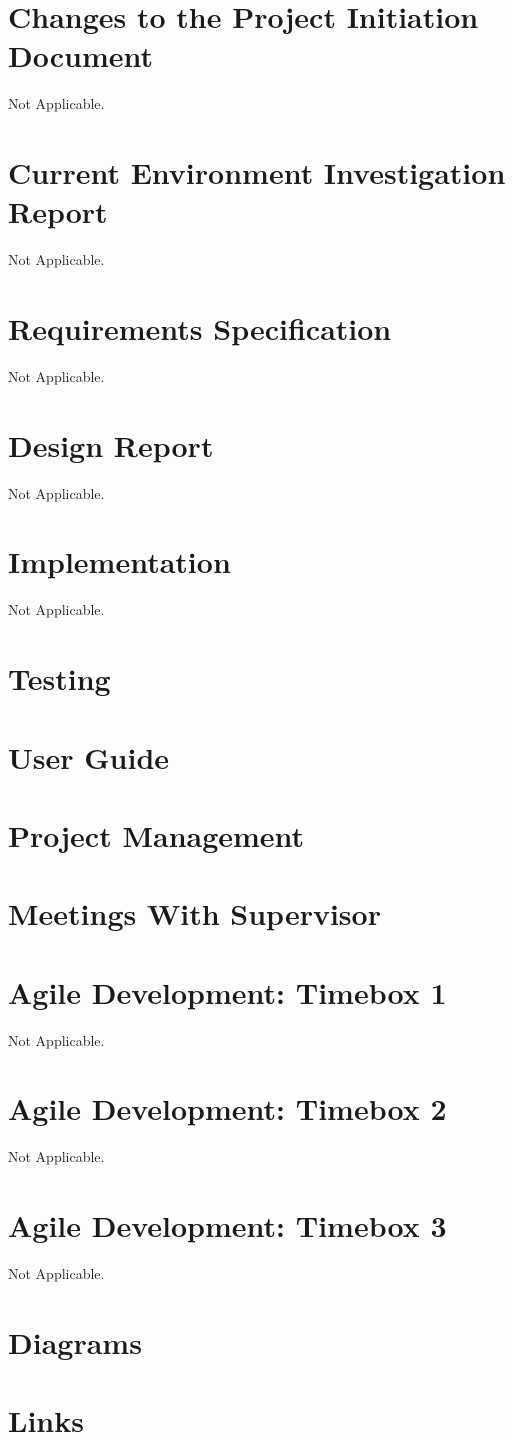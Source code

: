 \documentclass[a4paper,12pt]{report}
\begin{document}
\chapter{Changes to the Project Initiation Document}
Not Applicable.
\chapter{Current Environment Investigation Report}
Not Applicable.
\chapter{Requirements Specification}
Not Applicable.
\chapter{Design Report}
Not Applicable.
\chapter{Implementation}
Not Applicable.
\chapter{Testing}

\chapter{User Guide}

\chapter{Project Management}

\chapter{Meetings With Supervisor}

\chapter{Agile Development: Timebox 1}
Not Applicable.
\chapter{Agile Development: Timebox 2}
Not Applicable.
\chapter{Agile Development: Timebox 3}
Not Applicable.
\chapter{Diagrams}

\chapter{Links}


\glsaddallunused
\end{document}
